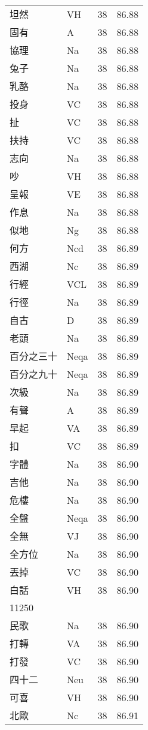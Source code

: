 \documentclass[twocolumn]{book}
\begin{document}
\begin{supertabular}{llrr}
坦然 & VH & 38 &  86.88\\
固有 & A & 38 &  86.88\\
協理 & Na & 38 &  86.88\\
兔子 & Na & 38 &  86.88\\
乳酪 & Na & 38 &  86.88\\
投身 & VC & 38 &  86.88\\
扯 & VC & 38 &  86.88\\
扶持 & VC & 38 &  86.88\\
志向 & Na & 38 &  86.88\\
吵 & VH & 38 &  86.88\\
呈報 & VE & 38 &  86.88\\
作息 & Na & 38 &  86.88\\
似地 & Ng & 38 &  86.88\\
何方 & Ncd & 38 &  86.89\\
西湖 & Nc & 38 &  86.89\\
行經 & VCL & 38 &  86.89\\
行徑 & Na & 38 &  86.89\\
自古 & D & 38 &  86.89\\
老頭 & Na & 38 &  86.89\\
百分之三十 & Neqa & 38 &  86.89\\
百分之九十 & Neqa & 38 &  86.89\\
次級 & Na & 38 &  86.89\\
有聲 & A & 38 &  86.89\\
早起 & VA & 38 &  86.89\\
扣 & VC & 38 &  86.89\\
字體 & Na & 38 &  86.90\\
吉他 & Na & 38 &  86.90\\
危樓 & Na & 38 &  86.90\\
全盤 & Neqa & 38 &  86.90\\
全無 & VJ & 38 &  86.90\\
全方位 & Na & 38 &  86.90\\
丟掉 & VC & 38 &  86.90\\
白話 & VH & 38 &  86.90\\
11250\\
民歌 & Na & 38 &  86.90\\
打轉 & VA & 38 &  86.90\\
打發 & VC & 38 &  86.90\\
四十二 & Neu & 38 &  86.90\\
可喜 & VH & 38 &  86.90\\
北歐 & Nc & 38 &  86.91\\

\end{supertabular}
\end{document}
